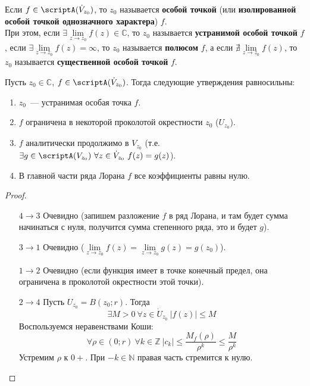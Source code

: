 \documentclass{article}
\begin{document}
    \begin{definition}
        Если $f\in\scriptA(\dot V_{z_0})$, то $z_0$ называется \textbf{особой точкой} (или \textbf{изолированной особой точкой однозначного характера}) $f$.\\
        При этом, если $\exists\lim\limits_{z\to z_0}f(z)\in\mathbb C$, то $z_0$ называется \textbf{устранимой особой точкой} $f$, если $\exists\lim\limits_{z\to z_0}f(z)=\infty$, то $z_0$ называется \textbf{полюсом} $f$, а если $\nexists\lim\limits_{z\to z_0}f(z)$, то $z_0$ называется \textbf{существенной особой точкой} $f$.
    \end{definition}
    \begin{theorem}
        Пусть $z_0\in\mathbb C$, $f\in\scriptA(\dot V_{z_0})$. Тогда следующие утверждения равносильны:
        \begin{enumerate}
            \item $z_0$~--- устранимая особая точка $f$.
            \item $f$ ограничена в некоторой проколотой окрестности $z_0$ ($U_{z_0}$).
            \item $f$ аналитически продолжимо в $V_{z_0}$ (т.е. $\exists g\in\scriptA(V_{z_0})~\forall z\in\dot V_{z_0}~f(z)=g(z)$).
            \item В главной части ряда Лорана $f$ все коэффициенты равны нулю.
        \end{enumerate}
    \end{theorem}
    \begin{proof}
        \begin{itemize}
            \item[$4\to3$] Очевидно (запишем разложение $f$ в ряд Лорана, и там будет сумма начинаться с нуля, получится сумма степенного ряда, это и будет $g$).
            \item[$3\to1$] Очевидно ($\lim\limits_{z\to z_0}f(z)=\lim\limits_{z\to z_0}g(z)=g(z_0)$).
            \item[$1\to2$] Очевидно (если функция имеет в точке конечный предел, она ограничена в проколотой окрестности этой точки).
            \item[$2\to4$] Пусть $U_{z_0}=B(z_0;r)$. Тогда
            $$
            \exists M>0~\forall z\in\dot U_{z_0}~|f(z)|\leqslant M
            $$
            Воспользуемся неравенствами Коши:
            $$
            \forall\rho\in(0;r)~\forall k\in\mathbb Z~|c_k|\leqslant\frac{M_f(\rho)}{\rho^k}\leqslant\frac M{\rho^k}
            $$
            Устремим $\rho$ к $0+$. При $-k\in\mathbb N$ правая часть стремится к нулю.
        \end{itemize}
    \end{proof}
\end{document}
